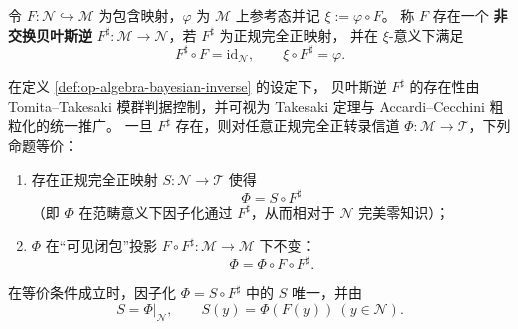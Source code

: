 \begin{definition}\label{def:op-algebra-bayesian-inverse}
令 \(F:\mathcal{N}\hookrightarrow\mathcal{M}\) 为包含映射，\(\varphi\) 为 \(\mathcal{M}\) 上参考态并记 \(\xi:=\varphi\circ F\)。
称 \(F\) 存在一个 \textbf{非交换贝叶斯逆} \(F^\sharp:\mathcal{M}\to\mathcal{N}\)，若 \(F^\sharp\) 为正规完全正映射，
并在 \(\xi\)-意义下满足
\begin{equation}\label{eq:op-algebra-bayes-inverse}
\boxed{\;F^\sharp\circ F=\mathrm{id}_{\mathcal{N}},\qquad \xi\circ F^\sharp=\varphi.\;}
\end{equation}
\end{definition}

\begin{theorem}\label{thm:op-algebra-bayes-inverse-zk}
在定义 \ref{def:op-algebra-bayesian-inverse} 的设定下，
贝叶斯逆 \(F^\sharp\) 的存在性由 Tomita--Takesaki 模群判据控制，并可视为 Takesaki 定理与 Accardi--Cecchini 粗粒化的统一推广。
一旦 \(F^\sharp\) 存在，则对任意正规完全正转录信道 \(\Phi:\mathcal{M}\to\mathcal{T}\)，下列命题等价：
\begin{enumerate}
  \item 存在正规完全正映射 \(S:\mathcal{N}\to\mathcal{T}\) 使得
  \begin{equation}\label{eq:op-algebra-zk-via-bayes-inverse}
  \boxed{\;\Phi = S\circ F^\sharp\;}
  \end{equation}
  （即 \(\Phi\) 在范畴意义下因子化通过 \(F^\sharp\)，从而相对于 \(\mathcal{N}\) 完美零知识）；
  \item \(\Phi\) 在“可见闭包”投影 \(F\circ F^\sharp:\mathcal{M}\to\mathcal{M}\) 下不变：
  \begin{equation}\label{eq:op-algebra-zk-closure-fixed}
  \boxed{\;\Phi=\Phi\circ F\circ F^\sharp.\;}
  \end{equation}
\end{enumerate}
在等价条件成立时，因子化 \(\Phi=S\circ F^\sharp\) 中的 \(S\) 唯一，并由
\begin{equation}\label{eq:op-algebra-zk-simulator-unique}
\boxed{\;S=\Phi|_{\mathcal{N}},\qquad S(y)=\Phi(F(y))\ (y\in\mathcal{N}).\;}
\end{equation}
\end{theorem}

